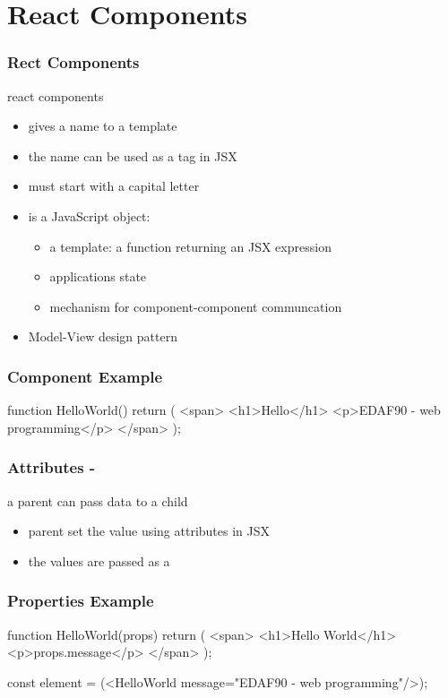 \section{React Components}
\begin{frame}[fragile] \frametitle{Rect Components}
react components
\begin{itemize}
  \item gives a name to a template
  \item the name can be used as a tag in JSX
  \item must start with a capital letter
  \item is a JavaScript object:
  \begin{itemize}
    \item a template: a function returning an JSX expression
    \item applications state
    \item mechanism for component-component communcation
  \end{itemize}
  \item Model-View design pattern
\end{itemize}
\end{frame}

\begin{frame}[fragile] \frametitle{Component Example}
\begin{CodeBox}{}
  function HelloWorld(){
    return (
      <span>
        <h1>Hello</h1>
        <p>EDAF90 - web programming</p>
      </span>
    );
  }
\end{CodeBox}
\end{frame}
\begin{frame}[fragile] \frametitle{Attributes - }
a parent can pass data to a child
\begin{itemize}
  \item parent set the value using attributes in JSX
  \item the values are passed as a 
\end{itemize}
\end{frame}

\begin{frame}[fragile] \frametitle{Properties Example}

\begin{CodeBox}{}
function HelloWorld(props) {
  return (
    <span>
      <h1>Hello World</h1>
      <p>{props.message}</p>
    </span>
  );
}

const element = (<HelloWorld 
                   message="EDAF90 - web programming"/>);
\end{CodeBox}
\end{frame}


